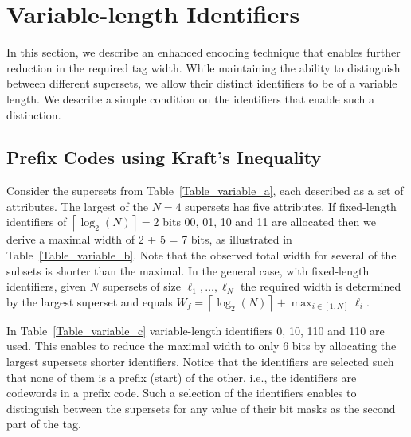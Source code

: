 \section{Variable-length Identifiers}\label{sec:identifiers}
In this section, we describe an enhanced encoding technique that enables further reduction in the required tag width.  While maintaining the ability to distinguish between different supersets, we allow their distinct identifiers to be of a variable length. We describe a simple condition on the identifiers that enable such a distinction. 
\subsection{Prefix Codes using Kraft's Inequality}

Consider the supersets from Table~\ref{Table_variable_a}, each described as a set of attributes. The largest of the $N=4$ supersets has five attributes. 
If fixed-length identifiers of $\left \lceil \log_2(N) \right \rceil = 2$ bits 00, 01, 10 and 11 are allocated then we derive a maximal width of 2 + 5 = 7 bits, as illustrated in Table~\ref{Table_variable_b}. 
Note that the observed total width for several of the subsets is shorter than the maximal.
In the general case, with fixed-length identifiers, given $N$ supersets of size $\ell_1, \ldots, \ell_N$ the required width is determined by the largest superset and equals 
 $W_{f} = \left \lceil \log_2(N) \right \rceil + \max_{i \in [1,N]} \ell_i$. 

In Table~\ref{Table_variable_c} variable-length identifiers 0, 10, 110 and 110 are used. This enables to reduce the maximal width to only 6 bits by allocating the largest supersets shorter identifiers. 
Notice that the identifiers are selected such that none of them is a prefix (start) of the other, i.e., the identifiers are codewords in a prefix code.
Such a selection of the identifiers enables to distinguish between the supersets for any value of their bit masks as the second part of the tag. 



%
%








